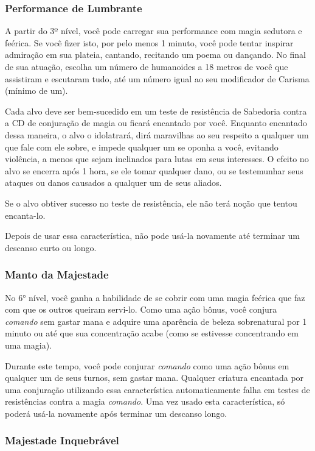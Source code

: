 \documentclass{RPG_Adventure}[2021/10/20]
\begin{document}
\begin{multicols}{2}
\subsubsection{Performance de Lumbrante}%

A partir do 3º nível, você pode carregar sua performance com magia sedutora e
feérica.
Se você fizer isto, por pelo menos 1 minuto, você pode tentar inspirar admiração
em sua plateia, cantando, recitando um poema ou dançando. No final de sua
atuação, escolha um número de humanoides a 18 metros de você que assistiram e
escutaram tudo, até um número igual ao seu modificador de Carisma (mínimo de
um).

Cada alvo deve ser bem-sucedido em um teste de resistência de Sabedoria contra
a CD de conjuração de magia ou ficará encantado por você. Enquanto encantado
dessa maneira, o alvo o idolatrará, dirá maravilhas ao seu respeito a qualquer
um que fale com ele sobre, e impede qualquer um se oponha a você, evitando
violência, a menos que sejam inclinados para lutas em seus interesses. O efeito
no alvo se encerra após 1 hora, se ele tomar qualquer dano, ou se testemunhar
seus ataques ou danos causados a qualquer um de seus aliados.

Se o alvo obtiver sucesso no teste de resistência, ele não terá noção que tentou
encanta-lo.

Depois de usar essa característica, não pode usá-la novamente até terminar um
descanso curto ou longo.

\subsubsection{Manto da Majestade}%

No 6° nível, você ganha a habilidade de se cobrir com uma magia feérica que faz
com que os outros queiram servi-lo. Como uma ação bônus, você conjura
\textit{comando} sem gastar mana e adquire uma aparência de beleza sobrenatural
por 1 minuto ou até que sua concentração acabe (como se estivesse concentrando
em uma magia).

Durante este tempo, você pode conjurar \textit{comando} como uma ação bônus em
qualquer um de seus turnos, sem gastar mana. Qualquer criatura encantada por uma
conjuração utilizando essa característica automaticamente falha em testes de
resistências contra a magia \textit{comando}. Uma vez usado esta característica,
só poderá usá-la novamente após terminar um descanso longo.

\subsubsection{Majestade Inquebrável}%


\end{multicols}
\end{document}
